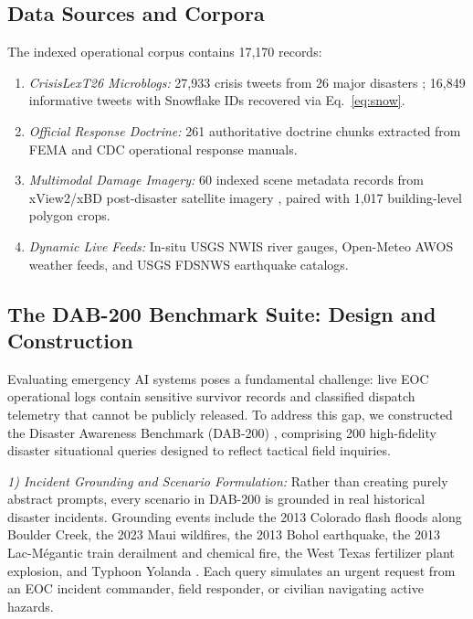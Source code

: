 \documentclass[conference]{IEEEtran}
\begin{document}
\subsection{Data Sources and Corpora}
The indexed operational corpus contains 17,170 records:
\begin{enumerate}
    \item \textit{CrisisLexT26 Microblogs:} 27,933 crisis tweets from 26 major disasters \cite{olteanu2015}; 16,849 informative tweets with Snowflake IDs recovered via Eq.~\eqref{eq:snow}.
    \item \textit{Official Response Doctrine:} 261 authoritative doctrine chunks extracted from FEMA and CDC operational response manuals.
    \item \textit{Multimodal Damage Imagery:} 60 indexed scene metadata records from xView2/xBD post-disaster satellite imagery \cite{xview2}, paired with 1,017 building-level polygon crops.
    \item \textit{Dynamic Live Feeds:} In-situ USGS NWIS river gauges, Open-Meteo AWOS weather feeds, and USGS FDSNWS earthquake catalogs.
\end{enumerate}

\subsection{The DAB-200 Benchmark Suite: Design and Construction}
Evaluating emergency AI systems poses a fundamental challenge: live EOC operational logs contain sensitive survivor records and classified dispatch telemetry that cannot be publicly released. To address this gap, we constructed the Disaster Awareness Benchmark (DAB-200) \cite{dab200}, comprising 200 high-fidelity disaster situational queries designed to reflect tactical field inquiries.

\textit{1) Incident Grounding and Scenario Formulation:} Rather than creating purely abstract prompts, every scenario in DAB-200 is grounded in real historical disaster incidents. Grounding events include the 2013 Colorado flash floods along Boulder Creek, the 2023 Maui wildfires, the 2013 Bohol earthquake, the 2013 Lac-M\'egantic train derailment and chemical fire, the West Texas fertilizer plant explosion, and Typhoon Yolanda \cite{olteanu2015}. Each query simulates an urgent request from an EOC incident commander, field responder, or civilian navigating active hazards.
\end{document}

